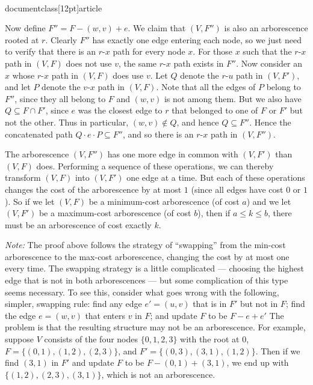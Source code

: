 \\documentclass[12pt]{article}
\begin{document}
\begin{enumerate}
{Now define $F'' = F - (w,v) + e$.
We claim that $(V,F'')$ is also an arborescence rooted at $r$.
Clearly $F''$ has exactly one edge entering each node,
so we just need to verify that there is an $r$-$x$
path for every node $x$.
For those $x$ such that the $r$-$x$ path in $(V,F)$ does not
use $v$, the same $r$-$x$ path exists in $F''$.
Now consider an $x$ whose $r$-$x$ path in $(V,F)$ does use $v$.
Let $Q$ denote the $r$-$u$ path in $(V,F')$,
and let $P$ denote the $v$-$x$ path in $(V,F)$.
Note that all the edges of $P$ belong to $F''$, since
they all belong to $F$ and $(w,v)$ is not among them.
But we also have $Q \subseteq F \cap F'$, since
$e$ was the closest edge to $r$ that belonged to one 
of $F$ or $F'$ but not the other.
Thus in particular, $(w,v) \not\in Q$, and hence $Q \subseteq F''$.
Hence the concatenated path $Q \cdot e \cdot P \subseteq F''$,
and so there is an $r$-$x$ path in $(V,F'')$.

The arborescence $(V,F'')$ has one more edge in common
with $(V,F')$ than $(V,F)$ does.
Performing a sequence of these operations,
we can thereby transform $(V,F)$ into $(V,F')$ one edge at a time.
But each of these operations changes the cost of the
arborescence by at most $1$ (since all edges have cost $0$ or $1$).
So if we let $(V,F)$ be a minimum-cost arborescence (of cost $a$)
and we let $(V,F')$ be a maximum-cost arborescence (of cost $b$),
then if $a \leq k \leq b$, there must be an
arborescence of cost exactly $k$.

\medskip
{\em Note:} The proof above follows the strategy of 
``swapping'' from the min-cost arborescence to 
the max-cost arborescence, changing the cost by at most
one every time.
The swapping strategy is a little complicated --- choosing
the highest edge that is not in both arborescences ---
but some complication of this type seems necessary.
To see this, consider what goes wrong with the following,
simpler, swapping rule:
find any edge $e' = (u,v)$ that is in $F'$ but not in $F$;
find the edge $e = (w,v)$ that enters $v$ in $F$;
and update $F$ to be $F - e + e'$
The problem is that the resulting structure may not
be an arborescence.
For example, suppose $V$ consists of the four nodes $\{0, 1, 2, 3\}$
with the root at $0$, 
$F = \{(0,1), (1,2), (2,3)\}$,
and $F' = \{(0,3), (3,1), (1,2)\}$.
Then if we find $(3,1)$ in $F'$ and update $F$ to be $F - (0,1) + (3,1)$,
we end up with $\{(1,2), (2,3), (3,1)\}$, which is not an arborescence.

}





\end{enumerate}
\end{document}
